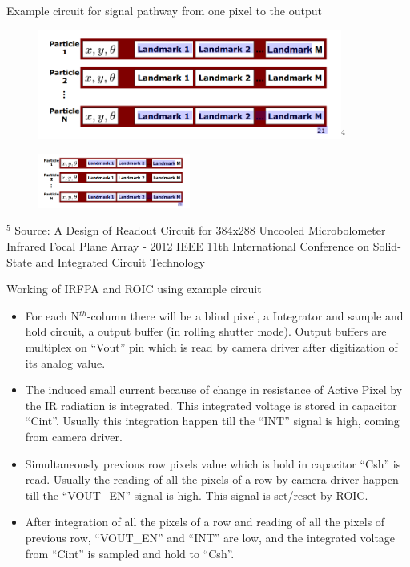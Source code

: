 \documentclass{beamer}
\begin{document}
\begin{frame}{Example circuit for signal pathway from one pixel to the output}
   \begin{figure}
            \centering
            \includegraphics[width= 100mm]{RBPF_SLAM.png}$^{4}$
    \end{figure}
    \begin{figure}
            \hfill
            \includegraphics[width = 50mm]{RBPF_SLAM.png}
    \end{figure}
\vfill
\tiny{$^{5}$} Source: A Design of Readout Circuit for 384x288 Uncooled Microbolometer Infrared Focal Plane Array - 2012 IEEE 11th International Conference on Solid-State and Integrated Circuit Technology
\end{frame}


\begin{frame}{Working of IRFPA and ROIC using example circuit}
    \begin{itemize}
        \item For each N{$^{th}$}-column there will be a blind pixel, a Integrator and sample and hold circuit, a output buffer (in rolling shutter mode). Output buffers are multiplex on “Vout” pin which is read by camera driver after digitization of its analog value.
        \item The induced small current because of change in resistance of Active Pixel by the IR radiation is integrated. This integrated voltage is stored in capacitor “Cint”. Usually this integration happen till the “INT” signal is high, coming from camera driver.
        \item Simultaneously previous row pixels value which is hold in capacitor “Csh” is read. Usually the reading of all the pixels of a row by camera driver happen till the “VOUT\_EN” signal is high. This signal is set/reset by ROIC.
        \item After integration of all the pixels of a row and reading of all the pixels of previous row, “VOUT\_EN” and “INT” are low, and the integrated voltage from “Cint” is sampled and hold to “Csh”.
    \end{itemize}
\end{frame}
\end{document}
